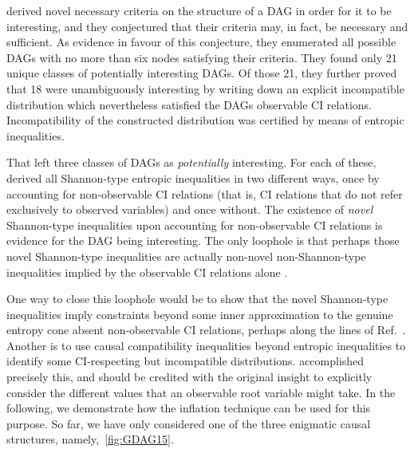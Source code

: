 {\citet{pusey2014gdag} derived novel necessary criteria on the structure of a DAG in order for it to be interesting, and they conjectured that their criteria may, in fact, be necessary and sufficient. As evidence in favour of this conjecture, they enumerated all possible DAGs with no more than six nodes satisfying their criteria.
They found only 21 unique classes of potentially interesting DAGs.
Of those 21, they further proved that 18 were unambiguously interesting by writing down an explicit incompatible distribution which nevertheless satisfied the DAGs observable CI relations. Incompatibility of the constructed distribution was certified by means of entropic inequalities. 

That left three classes of DAGs  as \emph{potentially} interesting. For each of these, \citet{pusey2014gdag} derived all Shannon-type entropic inequalities in two different ways, once by accounting for non-observable CI relations (that is, CI relations that do not refer exclusively to observed variables) and once without. The existence of \emph{novel} Shannon-type inequalities upon accounting for non-observable CI relations is evidence for the DAG being interesting. The only loophole is that perhaps those novel Shannon-type inequalities are actually non-novel non-Shannon-type inequalities implied by the observable CI relations alone \cite{pusey2014gdag}. %

One way to close this loophole would be to show that the novel Shannon-type inequalities imply constraints beyond some inner approximation to the genuine entropy cone absent non-observable CI relations, perhaps along the lines of Ref.~\cite{weilenmann2016entropic}. Another is to use causal compatibility inequalities beyond entropic inequalities to identify some CI-respecting but incompatible distributions. \citet{pianaar2016interesting} accomplished precisely this, and should be credited with the original insight to explicitly consider the different values that an observable root variable might take. In the following, we demonstrate how the inflation technique can be used for this purpose. So far, we have only considered one of the three enigmatic causal structures, namely,~\cref{fig:GDAG15}.

}
